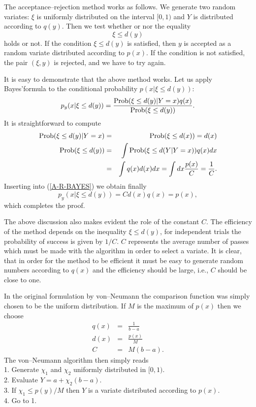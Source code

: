 The acceptance--rejection method works as follows. We generate two
random variates: $\xi$ is uniformly distributed on the interval
$[0,1)$ and $Y$ is distributed according to $q(y)$. Then we test
whether or nor the equality
\begin{equation*}
\xi \le d(y)
\end{equation*}
holds or not. If  the condition $\xi \le d(y)$ is satisfied, 
then $y$ is accepted as 
a random variate distributed according to $p(x)$.  If
the condition is not satisfied, the pair $(\xi,y)$ is rejected, 
and we have to try again.

It is easy to demonstrate that the above method works. Let us apply
Bayes'formula to the conditional probability $p(x|\xi \le d(y))$:
\begin{equation}
\label{A-R-BAYES}
p_y(x|\xi \le d(y)) = \frac{{\rm Prob}(\xi \le d(y)|Y=x)q(x)}
                  {{\rm Prob}(\xi \le d(y))}.
\end{equation}
It is straightforward to compute
\begin{eqnarray*}
{\rm Prob}(\xi \le d(y)|Y=x) &=& {\rm Prob}(\xi \le d(x)) = 
          d(x) \\
{\rm Prob}(\xi \le d(y)) & = & \int {\rm Prob}(\xi \le d(Y|Y=x)) q(x) dx \\
               &= & \int q(x) d(x)dx = \int dx \frac{p(x)}{C} = 
                   \frac{1}{C}.
\end{eqnarray*}
Inserting into (\ref{A-R-BAYES}) we obtain finally
\begin{equation*}
p_y(x|\xi \le d(y)) = Cd(x)q(x)=p(x),
\end{equation*}
which completes the proof.

The above discussion also makes evident the role of the constant
$C$. The efficiency of the method depends on the inequality $\xi \le 
d(y)$, for independent trials the probability of success is given 
by $1/C$. $C$ represents the average number of passes which must 
be made with the algorithm in order to select a variate. It is 
clear, that in order for the method to be efficient it must be 
easy to generate random numbers according to $q(x)$ and the 
efficiency should be large, i.e., $C$ should be close to one.

In the original formulation by von--Neumann the comparison 
function was simply chosen to be the uniform distribution. If
$M$ is the maximum of $p(x)$ then we choose
\begin{eqnarray*}
q(x) & = & \frac{1}{b-a} \\
d(x) & = & \frac{p(x)}{M} \\
C & = & M(b-a).
\end{eqnarray*}
The von--Neumann algorithm then simply reads \\
1. Generate $\chi_1$ and $\chi_2$ uniformly distributed in 
    $[0,1)$. \\
2. Evaluate $Y=a+\chi_2(b-a)$. \\
3. If $\chi_1 \le p(y)/M$ then $Y$ is a variate distributed 
    according to $p(x)$. \\
4. Go to 1.

